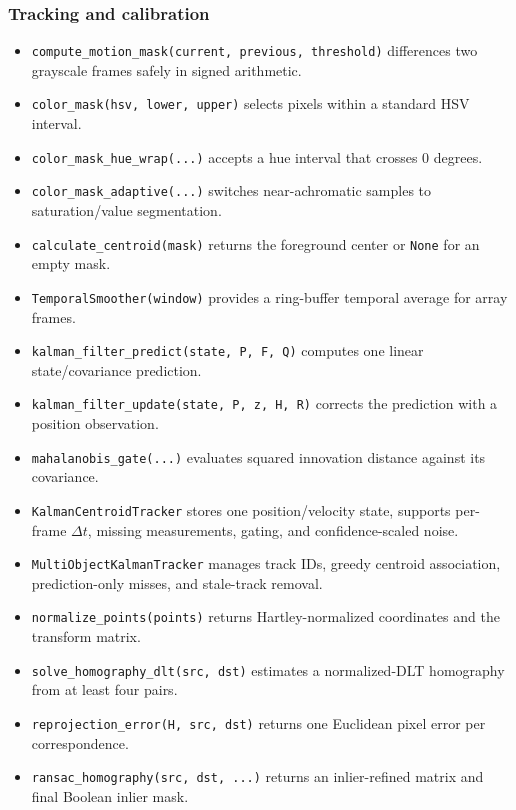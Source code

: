 \documentclass[11pt,a4paper]{article}
\newcommand{\1}{\mathbf{1}}
\begin{document}
\subsubsection{Tracking and calibration}
\begin{itemize}
 \item \texttt{compute\_motion\_mask(current, previous, threshold)} differences two grayscale frames safely in signed arithmetic.
 \item \texttt{color\_mask(hsv, lower, upper)} selects pixels within a standard HSV interval.
 \item \texttt{color\_mask\_hue\_wrap(...)} accepts a hue interval that crosses 0 degrees.
 \item \texttt{color\_mask\_adaptive(...)} switches near-achromatic samples to saturation/value segmentation.
 \item \texttt{calculate\_centroid(mask)} returns the foreground center or \texttt{None} for an empty mask.
 \item \texttt{TemporalSmoother(window)} provides a ring-buffer temporal average for array frames.
 \item \texttt{kalman\_filter\_predict(state, P, F, Q)} computes one linear state/covariance prediction.
 \item \texttt{kalman\_filter\_update(state, P, z, H, R)} corrects the prediction with a position observation.
 \item \texttt{mahalanobis\_gate(...)} evaluates squared innovation distance against its covariance.
 \item \texttt{KalmanCentroidTracker} stores one position/velocity state, supports per-frame $\Delta t$, missing measurements, gating, and confidence-scaled noise.
 \item \texttt{MultiObjectKalmanTracker} manages track IDs, greedy centroid association, prediction-only misses, and stale-track removal.
 \item \texttt{normalize\_points(points)} returns Hartley-normalized coordinates and the transform matrix.
 \item \texttt{solve\_homography\_dlt(src, dst)} estimates a normalized-DLT homography from at least four pairs.
 \item \texttt{reprojection\_error(H, src, dst)} returns one Euclidean pixel error per correspondence.
 \item \texttt{ransac\_homography(src, dst, ...)} returns an inlier-refined matrix and final Boolean inlier mask.
\end{itemize}
\end{document}

